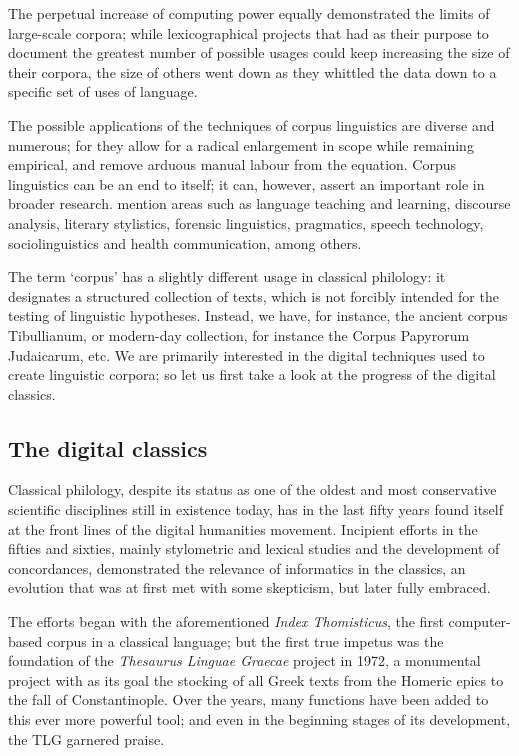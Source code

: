 The perpetual increase of computing power equally demonstrated the
limits of large-scale corpora; while lexicographical projects that had
as their purpose to document the greatest number of possible usages
could keep increasing the size of their corpora, the size of others
went down as they whittled the data down to a specific set of uses of
language.

The possible applications of the techniques of corpus linguistics are
diverse and numerous; for they allow for a radical enlargement in
scope while remaining empirical, and remove arduous manual labour from
the equation.  Corpus linguistics can be an end to itself; it can,
however, assert an important role in broader research.
\cite[7]{okeeffe2010} mention areas such as language teaching and
learning, discourse analysis, literary stylistics, forensic
linguistics, pragmatics, speech technology, sociolinguistics and
health communication, among others.

The term `corpus' has a slightly different usage in classical
philology: it designates a structured collection of texts, which is
not forcibly intended for the testing of linguistic
hypotheses. Instead, we have, for instance, the ancient corpus
Tibullianum, or modern-day collection, for instance the Corpus
Papyrorum Judaicarum, etc. We are primarily interested in the digital
techniques used to create linguistic corpora; so let us first take a
look at the progress of the digital classics.

\subsection{The digital classics}
Classical philology, despite its status as one of the oldest and most
conservative scientific disciplines still in existence today, has in
the last fifty years found itself at the front lines of the digital
humanities movement.  Incipient efforts in the fifties and sixties,
mainly stylometric and lexical studies and the development of
concordances, demonstrated the relevance of informatics in the
classics, an evolution that was at first met with some skepticism, but
later fully embraced.

The efforts began with the aforementioned \textit{Index Thomisticus}, the first
computer-based corpus in a classical language; but the first true
impetus was the foundation of the \textit{Thesaurus Linguae Graecae} project in
1972, a monumental project with as its goal the stocking of all Greek
texts from the Homeric epics to the fall of Constantinople. Over the
years, many functions have been added to this ever more powerful tool;
and even in the beginning stages of its development, the TLG garnered
praise.

